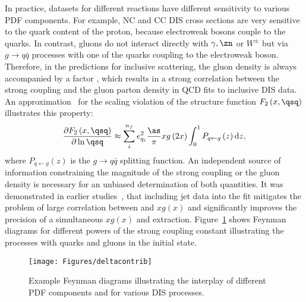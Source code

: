 In practice, datasets for different reactions have different sensitivity to various PDF components. For example, NC and CC DIS cross sections are very sensitive to the quark content of the proton, because electroweak bosons couple to the quarks. In contrast, gluons do not interact directly with $\gamma,\zn$ or $W^{\pm}$ but via $g\rightarrow q\bar q$ processes with one of the quarks coupling to the electroweak boson. Therefore, in the predictions for inclusive \ep scattering, the gluon density is always accompanied by a factor \as, which results in a strong correlation between the strong coupling and the gluon parton density in QCD fits to inclusive DIS data. An approximation~\cite{Prytz:1993vr} for the scaling violation of the structure function $F_2\left(x,\qsq \right)$ illustrates this property:
\begin{equation}
 \frac{\partial F_2\left(x,\qsq \right)}{\partial \ln \qsq} \approx \sum_i^{n_f}e_{q_i}^2 \frac{\as}{\pi} xg\left(2x\right) \int_0^1 P_{q\leftarrow g}\left(z\right)\mathrm{d}z, 
\end{equation}
where $P_{q\leftarrow g}\left(z\right)$ is the $g\rightarrow q\bar q$ splitting function. An independent source of information constraining the magnitude of the strong coupling or the gluon density is necessary for an unbiased determination of both quantities. It was demonstrated in earlier studies~\cite{Chekanov:2005nn,upub:herapdf1.7}, that including jet data into the fit mitigates the problem of large correlation between \as and $xg\left(x\right)$ and significantly improves the precision of a simultaneous $xg\left(x\right)$ and \as extraction. Figure~\ref{fig:pdfcontributions} shows Feynman diagrams for different powers of the strong coupling constant illustrating the processes with quarks and gluons in the initial state.
\begin{figure}[htp]
 \centering
 \begin{center}
 \texttt{[image: Figures/deltacontrib]}
\end{center}
 \caption{Example Feynman diagrams illustrating the interplay of different PDF components and \as for various DIS processes.}
 \label{fig:pdfcontributions}
\end{figure}
